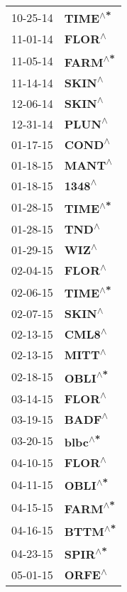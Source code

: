 \begin{supertabular}{p{0.08\textwidth}p{0.2\textwidth}}
 10-25-14 &   \textbf{TIME\textsuperscript{$\wedge$*}} \\
 11-01-14 &    \textbf{FLOR\textsuperscript{$\wedge$}} \\
 11-05-14 &   \textbf{FARM\textsuperscript{$\wedge$*}} \\
 11-14-14 &    \textbf{SKIN\textsuperscript{$\wedge$}} \\
 12-06-14 &    \textbf{SKIN\textsuperscript{$\wedge$}} \\
 12-31-14 &    \textbf{PLUN\textsuperscript{$\wedge$}} \\
 01-17-15 &    \textbf{COND\textsuperscript{$\wedge$}} \\
 01-18-15 &    \textbf{MANT\textsuperscript{$\wedge$}} \\
 01-18-15 &    \textbf{1348\textsuperscript{$\wedge$}} \\
 01-28-15 &   \textbf{TIME\textsuperscript{$\wedge$*}} \\
 01-28-15 &     \textbf{TND\textsuperscript{$\wedge$}} \\
 01-29-15 &     \textbf{WIZ\textsuperscript{$\wedge$}} \\
 02-04-15 &    \textbf{FLOR\textsuperscript{$\wedge$}} \\
 02-06-15 &   \textbf{TIME\textsuperscript{$\wedge$*}} \\
 02-07-15 &    \textbf{SKIN\textsuperscript{$\wedge$}} \\
 02-13-15 &    \textbf{CML8\textsuperscript{$\wedge$}} \\
 02-13-15 &    \textbf{MITT\textsuperscript{$\wedge$}} \\
 02-18-15 &   \textbf{OBLI\textsuperscript{$\wedge$*}} \\
 03-14-15 &    \textbf{FLOR\textsuperscript{$\wedge$}} \\
 03-19-15 &    \textbf{BADF\textsuperscript{$\wedge$}} \\
 03-20-15 &   \textbf{blbc\textsuperscript{$\wedge$*}} \\
 04-10-15 &    \textbf{FLOR\textsuperscript{$\wedge$}} \\
 04-11-15 &   \textbf{OBLI\textsuperscript{$\wedge$*}} \\
 04-15-15 &   \textbf{FARM\textsuperscript{$\wedge$*}} \\
 04-16-15 &   \textbf{BTTM\textsuperscript{$\wedge$*}} \\
 04-23-15 &   \textbf{SPIR\textsuperscript{$\wedge$*}} \\
 05-01-15 &    \textbf{ORFE\textsuperscript{$\wedge$}} \\

\end{supertabular}
